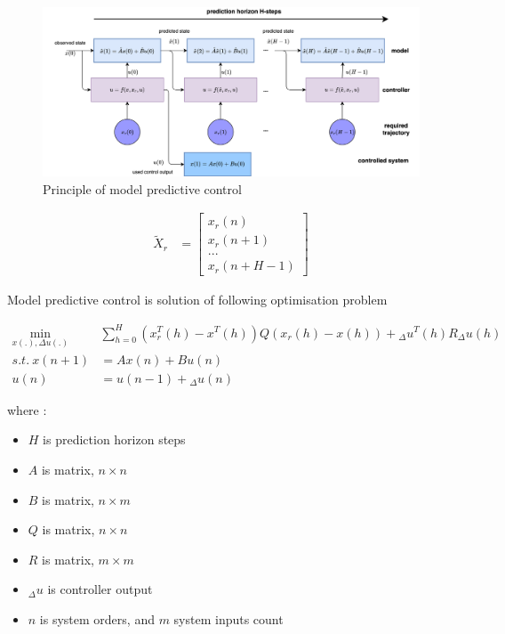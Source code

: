 \documentclass[12pt,twoside,onecolumn,openany,extrafontsizes,dvipsnames]{memoir}
\begin{document}
        \begin{figure}[!htb]
            \centering
            \includegraphics[scale=0.5]{../diagrams/control/control-mpc_steps.png}
            \caption{Principle of model predictive control}
            \label{fig:mpc_steps}
        \end{figure}


        \begin{align}
            \tilde{X}_r &= \begin{bmatrix} x_r(n) \\ x_r(n + 1) \\ ... \\ x_r(n + H - 1) \end{bmatrix}
            \label{eq:required_trajectory}  
        \end{align}


      

        
        Model predictive control is solution of following optimisation problem

        \begin{align}
            \min_{x(.), \Delta u(.)} &\sum_{h=0}^H (x_r^T(h) - x^T(h))Q(x_r(h) - x(h)) + {_\Delta u}^T(h)R {_\Delta u}(h) \\
            s.t.\ x(n+1) &= Ax(n) + Bu(n) \nonumber \\
            u(n) &= u(n-1) + {_\Delta u}(n) \nonumber
        \end{align}

        where : 
        \begin{itemize}
          \item $H$ is prediction horizon steps
          \item $A$ is matrix, $n \times n$
          \item $B$ is matrix, $n \times m$
          \item $Q$ is matrix, $n \times n$
          \item $R$ is matrix, $m \times m$
          \item ${_\Delta u}$ is controller output
          \item $n$ is system orders, and $m$ system inputs count
        \end{itemize}
\end{document}
